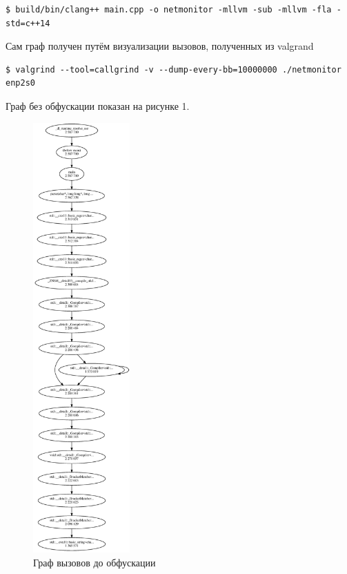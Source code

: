 \begin{Verbatim}[frame=single]
$ build/bin/clang++ main.cpp -o netmonitor -mllvm -sub -mllvm -fla -std=c++14
\end{Verbatim}

Сам граф получен путём визуализации вызовов, полученных из valgrand

\begin{Verbatim}[frame=single]
$ valgrind --tool=callgrind -v --dump-every-bb=10000000 ./netmonitor enp2s0
\end{Verbatim}

Граф без обфускации показан на рисунке 1.

\begin{figure}[htp]
\begin{center}
  \includegraphics[width=0.33\textwidth]{res/callgraph}
  \caption{Граф вызовов до обфускации}
  \label{fig:myGraph}
\end{center}
\end{figure}

